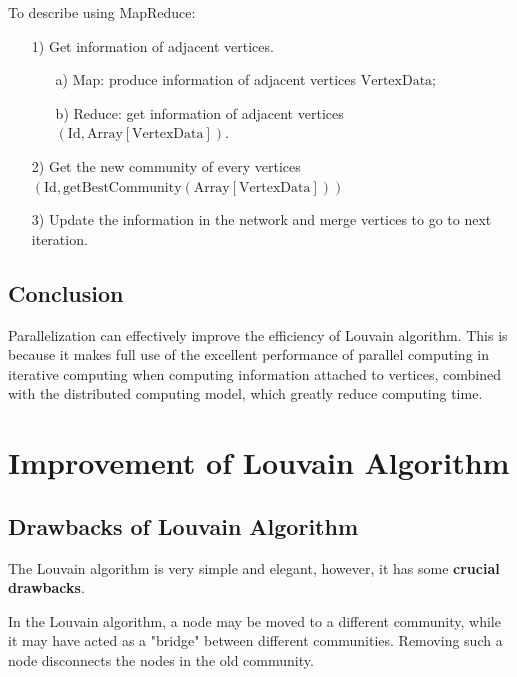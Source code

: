 \documentclass[11pt]{article}
\begin{document}
To describe using MapReduce:
\begin{itemize}
  \item [1)] Get information of adjacent vertices.
        \begin{itemize}
          \item [a)] Map: produce information of adjacent vertices $\text{VertexData}$;
          \item [b)] Reduce: get information of adjacent vertices $(\text{Id}, \text{Array}[\text{VertexData}])$.
        \end{itemize}
  \item [2)] Get the new community of every vertices $(\text{Id}, \text{getBestCommunity}(\text{Array}[\text{VertexData}]))$
  \item [3)] Update the information in the network and merge vertices to go to next iteration.
\end{itemize}

\subsection{Conclusion}

Parallelization can effectively improve the efficiency of Louvain algorithm. This is because it makes full use of the excellent performance of parallel computing in iterative computing when computing information attached to vertices, combined with the distributed computing model, which greatly reduce computing time.

\section{Improvement of Louvain Algorithm}
\subsection{Drawbacks of Louvain Algorithm}
The Louvain algorithm is very simple and elegant, however, it has some \textbf{crucial drawbacks}. 

\noindent In the Louvain algorithm, a node may be moved to a different community, while it may have acted as a "bridge" between different communities. Removing such a node disconnects the nodes in the old community. 
\end{document}
